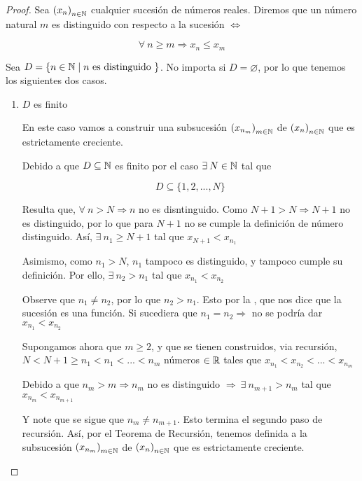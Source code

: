 \begin{proof}
    Sea ${\left( x_n\right)}_{n \in \mathbb{N}}$ cualquier sucesión de números reales. Diremos que un número natural $m$ es distinguido con respecto a la sucesión $\iff$

    $$\forall \: n \geqslant m \Rightarrow x_n \leqslant x_m $$

    Sea $D = \{ n \in \mathbb{N} \mid n \text{ es distinguido } \}$. No importa si $D = \varnothing$, por lo que tenemos los siguientes dos casos.

    \begin{enumerate}
        \item $D$ es finito

        En este caso vamos a construir una subsucesión ${\left( x_{n_m}\right)}_{m \in \mathbb{N}}$ de ${\left( x_n\right)}_{n \in \mathbb{N}}$ que es estrictamente creciente.

        Debido a que $D \subseteq \mathbb{N}$ es finito por el caso $\exists \: N \in \mathbb{N}$ tal que

        $$D \subseteq \{ 1, 2, ..., N \}$$

        Resulta que, $\forall \: n > N \Rightarrow n$ no es disntinguido. Como $N + 1 > N \Rightarrow N +1$ no es distinguido, por lo que para $N + 1$ no se cumple la definición de número distinguido. Así, $\exists \: n_1 \geqslant N +1$ tal que $x_{N+1} < x_{n_1}$

        Asimismo, como $n_1 > N$, $n_1$ tampoco es distinguido, y tampoco cumple su definición. Por ello, $\exists \: n_2 > n_1$ tal que $x_{n_1} < x_{n_2}$

        Observe que $n_1 \neq n_2$, por lo que $n_2 > n_1$. Esto por la , que nos dice que la sucesión es una función. Si sucediera que $n_1 = n_2 \Rightarrow$ no se podría dar $x_{n_1} < x_{n_2}$

        Supongamos ahora que $m \geqslant 2$, y que se tienen construidos, via recursión, $N < N + 1 \geqslant n_1 < n_1 < ... < n_m$ números $\in \mathbb{R}$ tales que  $x_{n_1} < x_{n_2} < ... < x_{n_m}$

        Debido a que $n_m > m \Rightarrow n_m$ no es distinguido $\Rightarrow \: \exists \: n_{m+1} > n_m$ tal que $x_{n_m} < x_{n_{m+1}}$

        Y note que se sigue que $n_m \neq n_{m+1}$. Esto termina el segundo paso de recursión. Así, por el Teorema de Recursión, tenemos definida a la subsucesión ${\left( x_{n_m}\right)}_{m \in \mathbb{N}}$ de ${\left( x_n\right)}_{n \in \mathbb{N}}$ que es estrictamente creciente. 
        

\end{enumerate}
\end{proof}
